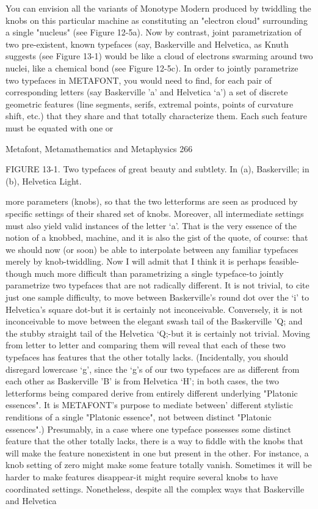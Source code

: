    You can envision all the variants of Monotype Modern produced by twiddling the
knobs on this particular machine as constituting an "electron cloud" surrounding a single
"nucleus" (see Figure 12-5a). Now by contrast, joint parametrization of two pre-existent,
known typefaces (say, Baskerville and Helvetica, as Knuth suggests (see Figure 13-1)
would be like a cloud of electrons swarming around two nuclei, like a chemical bond (see
Figure 12-5c).
   In order to jointly parametrize two typefaces in METAFONT, you would need to find,
for each pair of corresponding letters (say Baskerville 'a' and Helvetica `a') a set of
discrete geometric features (line segments, serifs, extremal points, points of curvature
shift, etc.) that they share and that totally characterize them. Each such feature must be
equated with one or




Metafont, Metamathematics and Metaphysics                                                 266

FIGURE 13-1. Two typefaces of great beauty and subtlety. In (a), Baskerville; in (b),
Helvetica Light.

more parameters (knobs), so that the two letterforms are seen as produced by specific
settings of their shared set of knobs. Moreover, all intermediate settings must also yield
valid instances of the letter `a'. That is the very essence of the notion of a knobbed,
machine, and it is also the gist of the quote, of course: that we should now (or soon) be
able to interpolate between any familiar typefaces merely by knob-twiddling.
    Now I will admit that I think it is perhaps feasible-though much more difficult than
parametrizing a single typeface-to jointly parametrize two typefaces that are not radically
different. It is not trivial, to cite just one sample difficulty, to move between Baskerville's
round dot over the `i' to Helvetica's square dot-but it is certainly not inconceivable.
Conversely, it is not inconceivable to move between the elegant swash tail of the
Baskerville 'Q; and the stubby straight tail of the Helvetica `Q;-but it is certainly not
trivial.
    Moving from letter to letter and comparing them will reveal that each of these two
typefaces has features that the other totally lacks. (Incidentally, you should disregard
lowercase `g', since the `g's of our two typefaces are as different from each other as
Baskerville 'B' is from Helvetica `H'; in both cases, the two letterforms being compared
derive from entirely different underlying "Platonic essences". It is METAFONT's
purpose to mediate between' different stylistic renditions of a single "Platonic essence",
not between distinct "Platonic essences".) Presumably, in a case where one typeface
possesses some distinct feature that the other totally lacks, there is a way to fiddle with
the knobs that will make the feature nonexistent in one but present in the other. For
instance, a knob setting of zero might make some feature totally vanish. Sometimes it
will be harder to make features disappear-it might require several knobs to have
coordinated settings. Nonetheless, despite all the complex ways that Baskerville and
Helvetica




